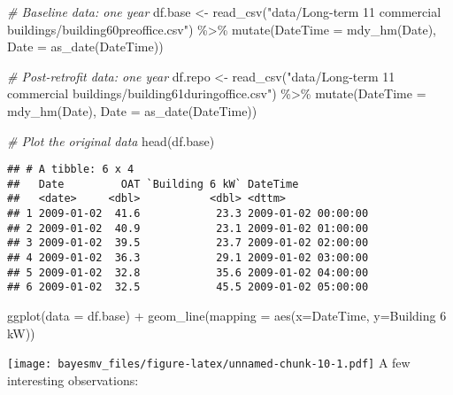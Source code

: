 \documentclass[
]{article}
\newenvironment{Shaded}{\begin{snugshade}}{\end{snugshade}}
\newcommand{\AttributeTok}[1]{\textcolor[rgb]{0.77,0.63,0.00}{#1}}
\newcommand{\CommentTok}[1]{\textcolor[rgb]{0.56,0.35,0.01}{\textit{#1}}}
\newcommand{\FunctionTok}[1]{\textcolor[rgb]{0.00,0.00,0.00}{#1}}
\newcommand{\NormalTok}[1]{#1}
\newcommand{\OtherTok}[1]{\textcolor[rgb]{0.56,0.35,0.01}{#1}}
\newcommand{\SpecialCharTok}[1]{\textcolor[rgb]{0.00,0.00,0.00}{#1}}
\newcommand{\StringTok}[1]{\textcolor[rgb]{0.31,0.60,0.02}{#1}}
\begin{document}
\begin{Shaded}
\begin{Highlighting}[]
\CommentTok{\# Baseline data: one year}
\NormalTok{df.base }\OtherTok{\textless{}{-}} \FunctionTok{read\_csv}\NormalTok{(}\StringTok{"data/Long{-}term 11 commercial buildings/building60preoffice.csv"}\NormalTok{) }\SpecialCharTok{\%\textgreater{}\%} 
  \FunctionTok{mutate}\NormalTok{(}\AttributeTok{DateTime =} \FunctionTok{mdy\_hm}\NormalTok{(Date),}
         \AttributeTok{Date =} \FunctionTok{as\_date}\NormalTok{(DateTime))}

\CommentTok{\# Post{-}retrofit data: one year}
\NormalTok{df.repo }\OtherTok{\textless{}{-}} \FunctionTok{read\_csv}\NormalTok{(}\StringTok{"data/Long{-}term 11 commercial buildings/building61duringoffice.csv"}\NormalTok{) }\SpecialCharTok{\%\textgreater{}\%} 
  \FunctionTok{mutate}\NormalTok{(}\AttributeTok{DateTime =} \FunctionTok{mdy\_hm}\NormalTok{(Date),}
         \AttributeTok{Date =} \FunctionTok{as\_date}\NormalTok{(DateTime))}

\CommentTok{\# Plot the original data}
\FunctionTok{head}\NormalTok{(df.base)}
\end{Highlighting}
\end{Shaded}

\begin{verbatim}
## # A tibble: 6 x 4
##   Date         OAT `Building 6 kW` DateTime           
##   <date>     <dbl>           <dbl> <dttm>             
## 1 2009-01-02  41.6            23.3 2009-01-02 00:00:00
## 2 2009-01-02  40.9            23.1 2009-01-02 01:00:00
## 3 2009-01-02  39.5            23.7 2009-01-02 02:00:00
## 4 2009-01-02  36.3            29.1 2009-01-02 03:00:00
## 5 2009-01-02  32.8            35.6 2009-01-02 04:00:00
## 6 2009-01-02  32.5            45.5 2009-01-02 05:00:00
\end{verbatim}

\begin{Shaded}
\begin{Highlighting}[]
\FunctionTok{ggplot}\NormalTok{(}\AttributeTok{data =}\NormalTok{ df.base) }\SpecialCharTok{+} \FunctionTok{geom\_line}\NormalTok{(}\AttributeTok{mapping =} \FunctionTok{aes}\NormalTok{(}\AttributeTok{x=}\NormalTok{DateTime, }\AttributeTok{y=}\StringTok{\textasciigrave{}}\AttributeTok{Building 6 kW}\StringTok{\textasciigrave{}}\NormalTok{))}
\end{Highlighting}
\end{Shaded}

\texttt{[image: bayesmv\_files/figure-latex/unnamed-chunk-10-1.pdf]}
A few interesting observations:
\end{document}
